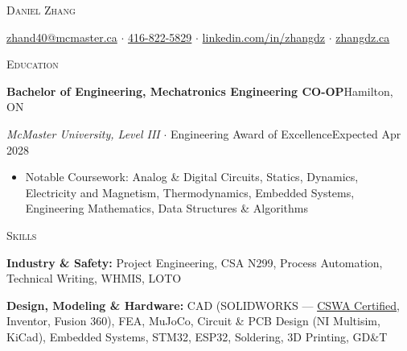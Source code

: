 \documentclass[a4paper]{article}
\newcommand{\lineunder} {
    \par\vspace*{-2pt}
    \noindent\hrulefill
    \par\vspace*{2pt}
}
\newcommand{\header}[1]{
    \vspace*{3pt}
    {\large\textsc{#1}}
    \lineunder
}
\begin{document}
\vspace*{-20pt}


\vspace*{-12pt}
\begin{center}
    {\Huge \scshape {Daniel Zhang}}\\
    \vspace{2pt}

\href{mailto:zhand40@mcmaster.ca}{zhand40@mcmaster.ca} $\cdot$
\href{tel:4168225829}{416-822-5829} $\cdot$
\href{https://www.linkedin.com/in/zhangdz/}{linkedin.com/in/zhangdz} $\cdot$
\href{https://zhangdz.ca}{zhangdz.ca} \\

\end{center}
\vspace*{-10pt}


\header{Education}
\textbf{Bachelor of Engineering, Mechatronics Engineering CO-OP}\hfill Hamilton, ON \par
\textit{McMaster University, Level III} $\cdot$ Engineering Award of Excellence\hfill Expected Apr 2028
\vspace{2mm}
\begin{itemize}
    \item Notable Coursework: Analog \& Digital Circuits, Statics, Dynamics, Electricity and Magnetism, Thermodynamics, Embedded Systems, Engineering Mathematics, Data Structures \& Algorithms
\end{itemize}

\vspace{1.5mm}

\header{Skills}
\vspace{1.5mm}
\textbf{Industry \& Safety:} Project Engineering, CSA N299, Process Automation, Technical Writing, WHMIS, LOTO
\par\vspace{3pt}

\textbf{Design, Modeling \& Hardware:} CAD (SOLIDWORKS --- \href{https://www.credly.com/badges/bcc90d7a-0618-4137-8657-ae155791fee6}{\underline{CSWA Certified}}, Inventor, Fusion 360), FEA, MuJoCo, Circuit \& PCB Design (NI Multisim, KiCad), Embedded Systems, STM32, ESP32, Soldering, 3D Printing, GD\&T
\par\vspace{3pt}
\end{document}
